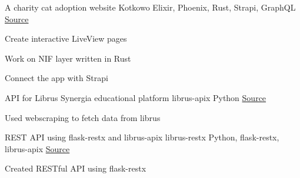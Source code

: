 

\begin{cventries}

  \cventry
    { A charity cat adoption website } %
    {Kotkowo} %
    {Elixir, Phoenix, Rust, Strapi, GraphQL} %
    {\href{https://github.com/kotkowo/kotkowo}{\faGithubSquare\acvHeaderIconSep Source}} %
    {
      \begin{cvitems} %
        \item {Create interactive LiveView pages}
        \item {Work on NIF layer written in Rust}
        \item {Connect the app with Strapi}
      \end{cvitems}
    } %
  \cventry
    {API for Librus Synergia educational platform} %
    {librus-apix} %
    {Python} %
    {\href{https://github.com/rustysnek/librus-apix}{\faGithubSquare\acvHeaderIconSep Source}} %
    {
      \begin{cvitems} %
        \item {Used webscraping to fetch data from librus}
      \end{cvitems}
    } %


  \cventry
    {REST API using flask-restx and librus-apix} %
    {librus-restx} %
    {Python, flask-restx, librus-apix} %
    {\href{https://github.com/rustysnek/librus-restx}{\faGithubSquare\acvHeaderIconSep Source}} %
    {
      \begin{cvitems} %
        \item {Created RESTful API using flask-restx}
      \end{cvitems}
    } %


\end{cventries}
